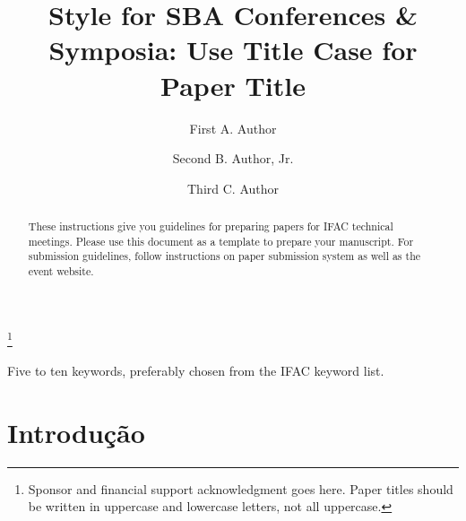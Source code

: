 \documentclass[a4paper]{ifacconf}
\begin{document}
\else
% 

\begin{frontmatter}

\title{Style for SBA Conferences \& Symposia: Use Title Case for
  Paper Title} 

\thanks[footnoteinfo]{Sponsor and financial support acknowledgment
goes here. Paper titles should be written in uppercase and lowercase
letters, not all uppercase.}

\author[First]{First A. Author} 
\author[Second]{Second B. Author, Jr.} 
\author[Third]{Third C. Author}


\address[First]{Faculdade de Engenharia Elétrica, Universidade do Triângulo, MG, (e-mail: autor1@faceg@univt.br).}
\address[Second]{Faculdade de Engenharia de Controle \& Automação, Universidade do Futuro, RJ (e-mail: autor2@feca.unifutu.rj)}
\address[Third]{Electrical Engineering Department, 
   Seoul National University, Seoul, Korea, (e-mail: author3@snu.ac.kr)}
   
\renewcommand{\abstractname}{{\bf Abstract:~}}   
   
\begin{abstract}                %
These instructions give you guidelines for preparing papers for IFAC
technical meetings. Please use this document as a template to prepare
your manuscript. For submission guidelines, follow instructions on
paper submission system as well as the event website.
\end{abstract}

\begin{keyword}
Five to ten keywords, preferably chosen from the IFAC keyword list.
\end{keyword}

\end{frontmatter}
\fi



\section{Introdução}
\end{document}
